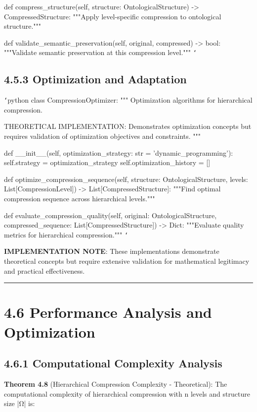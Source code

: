     def compress_structure(self, structure: OntologicalStructure) -> CompressedStructure:
        """Apply level-specific compression to ontological structure."""
        
    def validate_semantic_preservation(self, original, compressed) -> bool:
        """Validate semantic preservation at this compression level."""
\texttt{`}

\subsection{4.5.3 Optimization and Adaptation}

\texttt{`}python
class CompressionOptimizer:
    """
    Optimization algorithms for hierarchical compression.
    
    THEORETICAL IMPLEMENTATION: Demonstrates optimization concepts
    but requires validation of optimization objectives and constraints.
    """
    
    def __init__(self, optimization_strategy: str = 'dynamic_programming'):
        self.strategy = optimization_strategy
        self.optimization_history = []
        
    def optimize_compression_sequence(self, structure: OntologicalStructure, 
                                    levels: List[CompressionLevel]) -> List[CompressedStructure]:
        """Find optimal compression sequence across hierarchical levels."""
        
    def evaluate_compression_quality(self, original: OntologicalStructure,
                                   compressed_sequence: List[CompressedStructure]) -> Dict:
        """Evaluate quality metrics for hierarchical compression."""
\texttt{`}

\textbf{IMPLEMENTATION NOTE}: These implementations demonstrate theoretical concepts but require extensive validation for mathematical legitimacy and practical effectiveness.

\hrule

\section{4.6 Performance Analysis and Optimization}

\subsection{4.6.1 Computational Complexity Analysis}

\textbf{Theorem 4.8} (Hierarchical Compression Complexity - Theoretical): The computational complexity of hierarchical compression with n levels and structure size |Ω| is:

